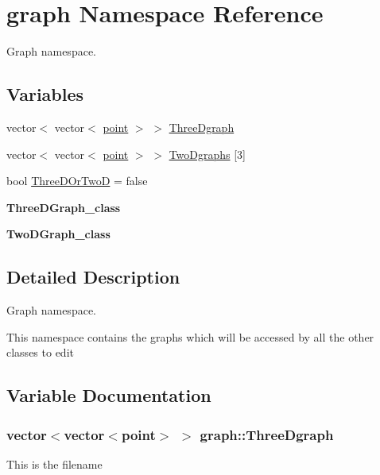 \hypertarget{namespacegraph}{}\section{graph Namespace Reference}
\label{namespacegraph}


Graph namespace.  


\subsection*{Variables}
\begin{DoxyCompactItemize}
\item 
vector$<$ vector$<$ \hyperlink{structpoint}{point} $>$ $>$ \hyperlink{namespacegraph_a595ffbbb517b17084391c65459fab7ff}{Three\+Dgraph}
\item 
vector$<$ vector$<$ \hyperlink{structpoint}{point} $>$ $>$ \hyperlink{namespacegraph_ac3d5fa2626975ad4c78b6eb5b1dac82f}{Two\+Dgraphs} \mbox{[}3\mbox{]}
\item 
bool \hyperlink{namespacegraph_aaa8a7bf9ccfc70dd98f403db09e1d57f}{Three\+D\+Or\+TwoD} = false
\item 
{\bfseries Three\+D\+Graph\+\_\+class}\hypertarget{namespacegraph_a6d6720407138e1b7385150ec904289ed}{}\label{namespacegraph_a6d6720407138e1b7385150ec904289ed}

\item 
{\bfseries Two\+D\+Graph\+\_\+class}\hypertarget{namespacegraph_ac1ee141f058e6cf5c5a0cd0b19461b96}{}\label{namespacegraph_ac1ee141f058e6cf5c5a0cd0b19461b96}

\end{DoxyCompactItemize}


\subsection{Detailed Description}
Graph namespace. 

This namespace contains the graphs which will be accessed by all the other classes to edit 

\subsection{Variable Documentation}
\subsubsection[{\texorpdfstring{Three\+Dgraph}{ThreeDgraph}}]{\setlength{\rightskip}{0pt plus 5cm}vector$<$vector$<${\bf point}$>$ $>$ graph\+::\+Three\+Dgraph}\hypertarget{namespacegraph_a595ffbbb517b17084391c65459fab7ff}{}\label{namespacegraph_a595ffbbb517b17084391c65459fab7ff}
This is the filename 
